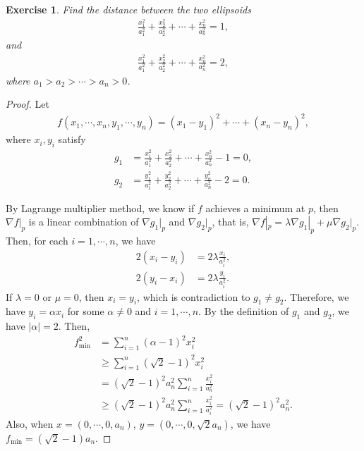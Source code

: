 \documentclass[11pt]{article}
\newtheorem{exercise}{Exercise}[section]
\theoremstyle{definition}
\numberwithin{equation}{subsection}
\begin{document}
\medskip

\begin{exercise}{\rm *}
Find the distance between the two ellipsoids
\begin{align*}
    \frac{x_1^2}{a_1^2} + \frac{x_2^2}{a_2^2} + \cdots + \frac{x_n^2}{a_n^2} = 1,
\end{align*}
and
\begin{align*}
    \frac{x_1^2}{a_1^2} + \frac{x_2^2}{a_2^2} + \cdots + \frac{x_n^2}{a_n^2} = 2,
\end{align*}
where $a_1 > a_2 > \cdots > a_n > 0$.
\end{exercise}
\begin{proof}
Let
\begin{align*}
    f(x_1, \cdots, x_n, y_1, \cdots, y_n) = (x_1 - y_1)^2 + \cdots + (x_n - y_n)^2,
\end{align*}
where $x_i, y_i$ satisfy
\begin{align*}
    g_1 & = \frac{x_1^2}{a_1^2} + \frac{x_2^2}{a_2^2} + \cdots + \frac{x_n^2}{a_n^2} - 1 = 0, \\
    g_2 & = \frac{y_1^2}{a_1^2} + \frac{y_2^2}{a_2^2} + \cdots + \frac{y_n^2}{a_n^2} - 2 = 0.
\end{align*}

By Lagrange multiplier method, we know if $f$ achieves a minimum at $p$, then $\nabla f|_p$ is a linear combination of $\nabla g_1|_p$ and $\nabla g_2|_p$, that is, $\nabla f|_p = \lambda \nabla g_1|_p + \mu \nabla g_2|_p$. Then, for each $i = 1, \cdots, n$, we have
\begin{align*}
    2(x_i - y_i) & = 2 \lambda \frac{x_i}{a_i^2}, \\
    2(y_i - x_i) & = 2 \lambda \frac{y_i}{a_i^2}.
\end{align*}
If $\lambda = 0$ or $\mu = 0$, then $x_i = y_i$, which is contradiction to $g_1 \neq g_2$. Therefore, we have $y_i = \alpha x_i$ for some $\alpha \neq 0$ and $i = 1, \cdots, n$. By the definition of $g_1$ and $g_2$, we have $|\alpha| = 2$. Then,
\begin{align*}
    f_{\min}^2 & = \sum^n_{i=1} (\alpha - 1)^2 x_i^2 \\
    & \geq \sum^n_{i=1} (\sqrt{2} - 1)^2 x_i^2 \\
    & = (\sqrt{2} - 1)^2 a_n^2 \sum^n_{i=1} \frac{x_i^2}{a_n^2} \\
    & \geq (\sqrt{2} - 1)^2 a_n^2 \sum^n_{i=1} \frac{x_i^2}{a_i^2} = (\sqrt{2} - 1)^2 a_n^2.
\end{align*}
Also, when $x = (0, \cdots, 0, a_n)$, $y = (0, \cdots, 0, \sqrt{2}a_n)$, we have $f_{\min} = (\sqrt{2} - 1) a_n$.
\end{proof}
\end{document}
